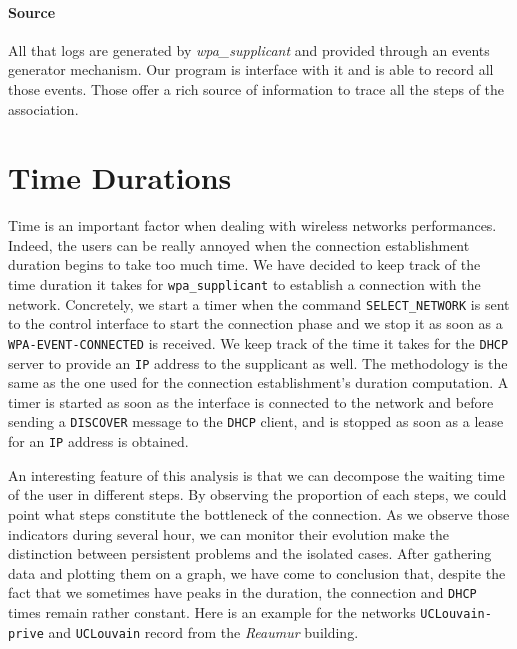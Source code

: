 \paragraph*{Source} All that logs are generated by \emph{wpa_supplicant} and provided through an events generator mechanism. Our program is interface with it and is able to record all those events. Those offer a rich source of information to trace all the steps of the association.

\section{Time Durations}
Time is an important factor when dealing with wireless networks performances. Indeed, the users can be really annoyed when the connection establishment duration begins to take too much time. We have decided to keep track of the time duration it takes for \texttt{wpa\_supplicant} to establish a connection with the network. Concretely, we start a timer when the command \texttt{SELECT\_NETWORK} is sent to the control interface to start the connection phase and we stop it as soon as a \texttt{WPA-EVENT-CONNECTED} is received. We keep track of the time it takes for the \texttt{DHCP} server to provide an \texttt{IP} address to the supplicant as well. The methodology is the same as the one used for the connection establishment's duration computation. A timer is started as soon as the interface is connected to the network and before sending a \texttt{DISCOVER} message to the \texttt{DHCP} client, and is stopped as soon as a lease for an \texttt{IP} address is obtained. 

 An interesting feature of this analysis is that we can decompose the waiting time of the user in different steps. By observing the proportion of each steps, we could point what steps constitute the bottleneck of the connection. As we observe those indicators during several hour, we can monitor their evolution make the distinction between persistent problems and the isolated cases. After gathering data and plotting them on a graph, we have come to conclusion that, despite the fact that we sometimes have peaks in the duration, the connection and \texttt{DHCP} times remain rather constant. Here is an example for the networks \texttt{UCLouvain-prive} and \texttt{UCLouvain} record from the \emph{Reaumur} building.

